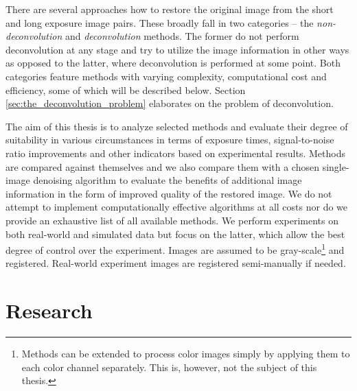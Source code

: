 \documentclass[12pt,notitlepage]{report}
\begin{document}
There are several approaches how to restore the original image from the short and long exposure image pairs. These broadly fall in two categories – the {\em non-deconvolution} and {\em deconvolution} methods. The former do not perform deconvolution at any stage and try to utilize the image information in other ways as opposed to the latter, where deconvolution is performed at some point. Both categories feature methods with varying complexity, computational cost and efficiency, some of which will be described below. Section \ref{sec:the_deconvolution_problem} elaborates on the problem of deconvolution. 

The aim of this thesis is to analyze selected methods and evaluate their degree of suitability in various circumstances in terms of exposure times, signal-to-noise ratio improvements and other indicators based on experimental results. Methods are compared against themselves and we also compare them with a chosen single-image denoising algorithm to evaluate the benefits of additional image information in the form of improved quality of the restored image. We do not attempt to implement computationally effective algorithms at all costs nor do we provide an exhaustive list of all available methods. We perform experiments on both real-world and simulated data but focus on the latter, which allow the best degree of control over the experiment. Images are assumed to be gray-scale\footnote[2]{Methods can be extended to process color images simply by applying them to each color channel separately. This is, however, not the subject of this thesis.} and registered. Real-world experiment images are registered semi-manually if needed.

\clearpage

\chapter{Research}
\label{chap:research}
\end{document}
